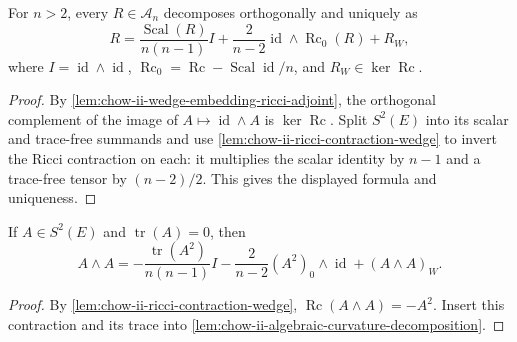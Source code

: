 \begin{lemma}
  \label{lem:chow-ii-algebraic-curvature-decomposition}
  For \(n>2\), every \(R\in\mathcal A_n\) decomposes orthogonally and uniquely as
  \[
  R=\frac{\operatorname{Scal}(R)}{n(n-1)}I
    +\frac2{n-2}\operatorname{id}\wedge\operatorname{Rc}_0(R)+R_W,
  \]
  where \(I=\operatorname{id}\wedge\operatorname{id}\),
  \(\operatorname{Rc}_0=\operatorname{Rc}-\operatorname{Scal}\operatorname{id}/n\),
  and \(R_W\in\ker\operatorname{Rc}\).
\end{lemma}
\begin{proof}
  By \ref{lem:chow-ii-wedge-embedding-ricci-adjoint}, the orthogonal
  complement of the image of \(A\mapsto\operatorname{id}\wedge A\) is
  \(\ker\operatorname{Rc}\).  Split \(S^2(E)\) into its scalar and trace-free
  summands and use \ref{lem:chow-ii-ricci-contraction-wedge} to invert the
  Ricci contraction on each: it multiplies the scalar identity by \(n-1\)
  and a trace-free tensor by \((n-2)/2\).  This gives the displayed formula
  and uniqueness.
\end{proof}

\begin{corollary}
  \label{cor:chow-ii-trace-free-square-wedge-decomposition}
  If \(A\in S^2(E)\) and \(\operatorname{tr}(A)=0\), then
  \[
  A\wedge A=-\frac{\operatorname{tr}(A^2)}{n(n-1)}I
    -\frac2{n-2}(A^2)_0\wedge\operatorname{id}+(A\wedge A)_W.
  \]
\end{corollary}
\begin{proof}
  By \ref{lem:chow-ii-ricci-contraction-wedge},
  \(\operatorname{Rc}(A\wedge A)=-A^2\).  Insert this contraction and its
  trace into \ref{lem:chow-ii-algebraic-curvature-decomposition}.
\end{proof}

